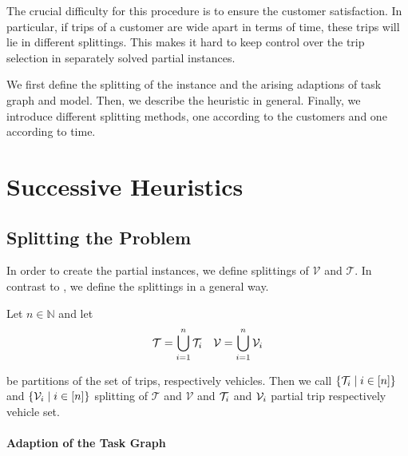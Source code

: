 The crucial difficulty for this procedure is to ensure the customer satisfaction. In particular, if trips of a customer are wide apart in terms of time, these trips will lie in different splittings. This makes it hard to keep control over the trip selection in separately solved partial instances.

We first define the splitting of the instance and the arising adaptions of task graph and model. Then, we describe the heuristic in general. Finally, we introduce different splitting methods, one according to the customers and one according to time. 


\section{Successive Heuristics}

\subsection{Splitting the Problem}

In order to create the partial instances, we define splittings of $\mathcal{V}$ and $\mathcal{T}$. In contrast to \cite{Knoll}, we define the splittings in a general way.

\begin{definition}[Splitting]
\label{def:splitting}

Let $n\in\mathbb{N}$ and let
\begin{align*}
	\mathcal{T}=\bigcup_{i=1}^n\mathcal{T}_i && \mathcal{V}=\bigcup_{i=1}^n\mathcal{V}_i
\end{align*}

be partitions of the set of trips, respectively vehicles. Then we call $\left\{\mathcal{T}_i\mid i\in[n]\right\}$ and $\left\{\mathcal{V}_i\mid i\in[n]\right\}$ splitting of $\mathcal{T}$ and $\mathcal{V}$ and $\mathcal{T}_i$ and $\mathcal{V}_i$ partial trip respectively vehicle set.

\end{definition}

\paragraph{Adaption of the Task Graph} \parfill

